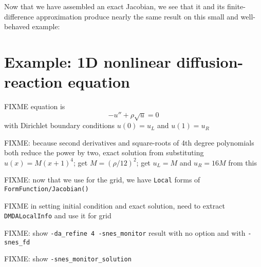 Now that we have assembled an exact Jacobian, we see that it and its finite-difference approximation produce nearly the same result on this small and well-behaved example:


\section{Example: 1D nonlinear diffusion-reaction equation}

FIXME equation is
\begin{equation}
-u'' + \rho \sqrt{u} = 0 \label{eq:nl:diffusionreaction}
\end{equation}
with Dirichlet boundary conditions $u(0)=u_L$ and $u(1)=u_R$

FIXME: because second derivatives and square-roots of 4th degree polynomials both reduce the power by two, exact solution from substituting $u(x)=M(x+1)^4$; get $M=(\rho/12)^2$; get $u_L=M$ and $u_R=16 M$ from this


FIXME: now that we use \pDMDA for the grid, we have \texttt{Local} forms of \texttt{FormFunction/Jacobian()}

FIXME in setting initial condition and exact solution, need to extract \texttt{DMDALocalInfo} and use it for grid


FIXME: show \texttt{-da\_refine 4 -snes\_monitor} result with no option and with \texttt{-snes\_fd}


FIXME: show \texttt{-snes\_monitor\_solution}


